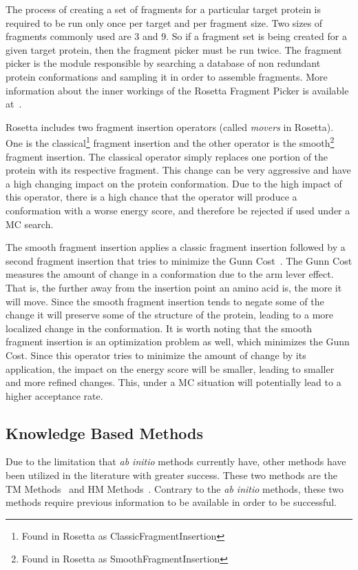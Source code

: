The process of creating a set of fragments for a particular target protein
is required to be run only once per target and per fragment size. Two sizes of
fragments commonly used are 3 and 9. So if a fragment set is being created
for a given target protein, then the fragment picker must be run twice. The
fragment picker is the module responsible by searching a database of
non redundant protein conformations and sampling it in order to assemble
fragments. More information about the inner workings of the Rosetta Fragment
Picker is available at~\cite{gront2011generalized}.

Rosetta includes two fragment insertion operators (called \textit{movers} in
Rosetta). One is the classical\footnote{Found in Rosetta as
ClassicFragmentInsertion} fragment insertion and the other operator is the
smooth\footnote{Found in Rosetta as SmoothFragmentInsertion} fragment
insertion. The classical operator simply replaces one portion of the protein
with its respective fragment. This change can be very aggressive and have a
high changing impact on the protein conformation. Due to the high impact of
this operator, there is a high chance that the operator will produce a
conformation with a worse energy score, and therefore be rejected if used under
a \ac{MC} search.

The smooth fragment insertion applies a classic fragment insertion followed by
a second fragment insertion that tries to minimize the Gunn
Cost~\cite{gunn1997sampling}. The Gunn Cost measures the amount of change in a
conformation due to the arm lever effect. That is, the further away from the
insertion point an amino acid is, the more it will move. Since the smooth
fragment insertion tends to negate some of the change it will preserve some of
the structure of the protein, leading to a more localized change in the
conformation. It is worth noting that the smooth fragment insertion is an
optimization problem as well, which minimizes the Gunn Cost.  Since this
operator tries to minimize the amount of change by its application, the impact
on the energy score will be smaller, leading to smaller and more refined
changes. This, under a \ac{MC} situation will potentially lead to a higher
acceptance rate.

\subsection{Knowledge Based Methods}

Due to the limitation that \textit{ab initio} methods currently have, other
methods have been utilized in the literature with greater success. These two
methods are the \ac{TM} Methods~\cite{dorn2014three} and \ac{HM}
Methods~\cite{leach2001molecular}. Contrary to the \textit{ab initio} methods,
these two methods require previous information to be available in order to be
successful.

